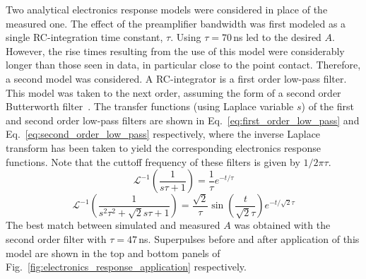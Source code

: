Two analytical electronics response models were considered in place of the measured one. The effect of the preamplifier bandwidth was first modeled as a single RC-integration time constant, $\tau$. Using $\tau = 70$\,ns led to the desired $A$. However, the rise times resulting from the use of this model were considerably longer than those seen in data, in particular close to the point contact. Therefore, a second model was considered. A RC-integrator is a first order low-pass filter. This model was taken to the next order, assuming the form of a second order Butterworth filter~\cite{Butterworth1930}. The transfer functions (using Laplace variable $s$) of the first and second order low-pass filters are shown in Eq.~\ref{eq:first_order_low_pass} and Eq.~\ref{eq:second_order_low_pass} respectively, where the inverse Laplace transform has been taken to yield the corresponding electronics response functions. Note that the cuttoff frequency of these filters is given by $1/2\pi\tau$. 
\begin{equation}
		\mathscr{L}^{-1}\left(\frac{1}{s\tau + 1}\right) = \frac{1}{\tau}e^{-t/\tau}
	\label{eq:first_order_low_pass}
\end{equation}
\begin{equation}
	\mathscr{L}^{-1}\left(\frac{1}{s^2\tau^2 +\sqrt{2}s\tau + 1}\right) = \frac{\sqrt{2}}{\tau}\sin\left(\frac{t}{\sqrt{2}\tau}\right)e^{-t/\sqrt{2}\tau}
	\label{eq:second_order_low_pass}
\end{equation}
The best match between simulated and measured $A$ was obtained with the second order filter with $\tau = 47$\,ns. Superpulses before and after application of this model are shown in the top and bottom panels of Fig.~\ref{fig:electronics_response_application} respectively.

